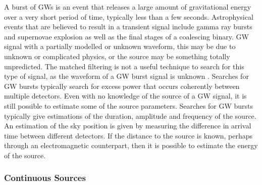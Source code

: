 \documentclass[binding=0.6cm, LaM]{sapthesis}
\begin{document}
	A burst of GWs is an event that releases a large amount 
	of gravitational energy over a very short period of time, typically less than a few seconds.  
	Astrophysical events that are believed to result in a transient signal 
	include gamma ray bursts and supernovae explosion as well as the final stages of a coalescing binary. 
	GW signal with a partially modelled or unknown waveform, 
	this may be due to unknown or complicated physics, or the source may be something totally unpredicted. 
	The matched filtering is not a useful technique to search for this type of signal, 
	as the waveform of a GW burst signal is unknown \cite{3}. 
	Searches for GW bursts typically search for excess power that occurs coherently between multiple detectors.  
	Even with no knowledge of the source of a GW signal, 
	it is still possible to estimate some of the source parameters. 
	Searches for GW bursts typically give estimations of the duration, 
	amplitude and frequency of the source. \\
	An estimation of the sky position is given by measuring the difference 
	in arrival time between different detectors. 
	If the distance to the source is known, 
	perhaps through an electromagnetic counterpart, 
	then it is possible to estimate the energy of the source. 


\subsubsection{Continuous Sources}
\end{document}
